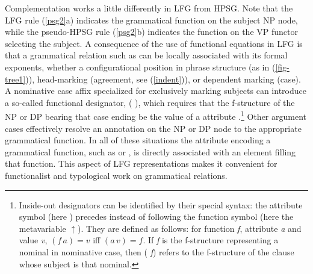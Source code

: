 Complementation works a little differently in LFG from HPSG.  Note that the LFG  rule (\ref{psg2}a) indicates the  grammatical function on the subject NP node, while the pseudo-HPSG rule (\ref{psg2}b) indicates the  function on the VP functor selecting the subject.   A consequence of the use of functional equations in LFG is that a grammatical relation such as  can be locally associated with its formal exponents, whether a configurational position in phrase structure (as in (\ref{fig-tree1})), head-marking (agreement, see (\ref{indent})), or dependent marking (case).  A nominative case affix specialized for exclusively marking subjects can introduce a so-called  functional designator, ( \Up),
 which requires that the f-structure of the NP or DP bearing that case ending be the value of a  attribute \citep{Nordlinger98a-u}.\footnote{Inside-out designators can be identified by their special syntax: the attribute symbol (here ) precedes instead of following the function symbol (here the metavariable $\uparrow$).  
They are defined as follows:  for function \textit{f}, attribute \textit{a} and value \textit{v}, $(f \, a) = v$ iff $(a \, v) = f$. If \textit{f} is the f-structure representing a nominal in nominative case, then ( \textit{f}) refers to the f-structure of the clause whose subject is that nominal.}  Other argument cases effectively resolve an annotation on the NP or DP node to the appropriate grammatical function.  In all of these situations the attribute encoding a grammatical function, such as  or , is directly associated with an element filling that function.  This aspect of LFG representations makes it convenient for functionalist and typological work on grammatical relations.  


 
